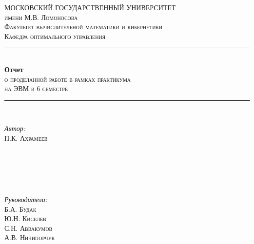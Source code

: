 \begin{titlepage}

\newcommand{\HRule}{\rule{\linewidth}{0.5mm}} %

\center %
 

\textsc{\LARGE МОСКОВСКИЙ ГОСУДАРСТВЕННЫЙ УНИВЕРСИТЕТ}\\[0.2cm] %
\textsc{\LARGE имени М.В. Ломоносова}\\[0.5cm] %
\textsc{\Large Факультет вычислительной математики и кибернетики}\\[0.5cm] %
\textsc{\large Кафедра оптимального управления}\\[2.5cm] %


\HRule \\[0.4cm]
{ \huge \bfseries Отчет}\\[0.2cm] %
\textsc{о проделанной работе в рамках практикума\\на ЭВМ в 6 семестре}
\HRule \\[1.5cm]
 

\begin{minipage}{0.4\textwidth}
\begin{flushleft} \large
\emph{Автор:}\\
П.К. \textsc{Ахрамеев}\\ %
\textsc{}\\
\textsc{}\\
\textsc{}\\
\end{flushleft}
\end{minipage}
~
\begin{minipage}{0.4\textwidth}
\begin{flushright} \large
\emph{Руководители:} \\
Б.А. \textsc{Будак}\\ %
Ю.Н. \textsc{Киселев}\\ %
С.Н. \textsc{Аввакумов}\\ %
А.В. \textsc{Ничипорчук}\\ %
\end{flushright}
\end{minipage}\\[4cm]


\end{titlepage}
